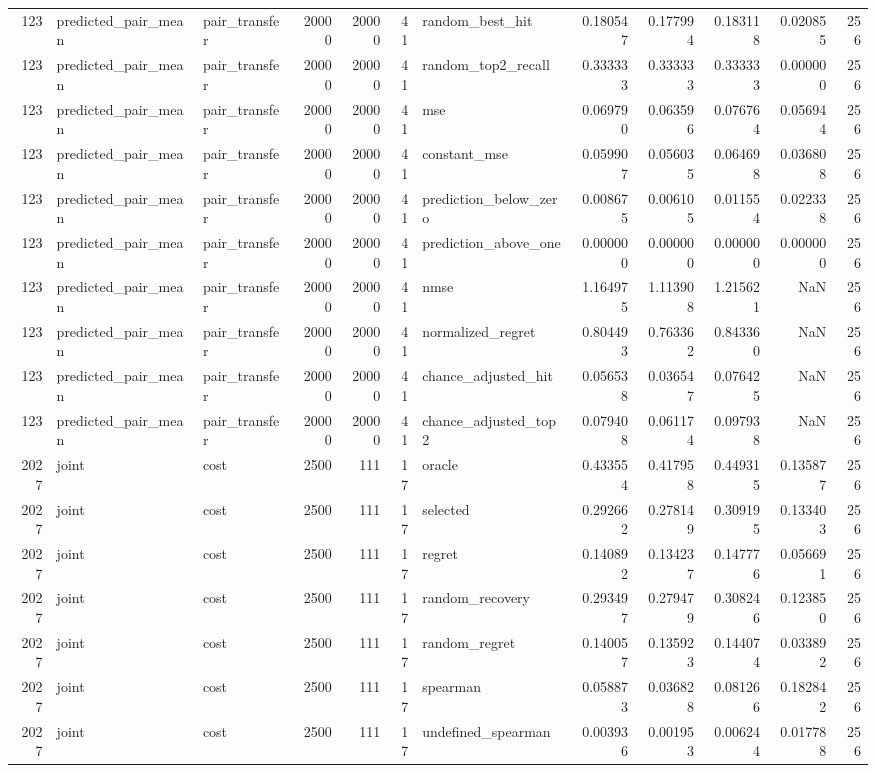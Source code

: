 \begin{tabular}{rllrrrlrrrrr}
123 & predicted_pair_mean & pair_transfer & 20000 & 20000 & 41 & random_best_hit & 0.180547 & 0.177994 & 0.183118 & 0.020855 & 256 \\
123 & predicted_pair_mean & pair_transfer & 20000 & 20000 & 41 & random_top2_recall & 0.333333 & 0.333333 & 0.333333 & 0.000000 & 256 \\
123 & predicted_pair_mean & pair_transfer & 20000 & 20000 & 41 & mse & 0.069790 & 0.063596 & 0.076764 & 0.056944 & 256 \\
123 & predicted_pair_mean & pair_transfer & 20000 & 20000 & 41 & constant_mse & 0.059907 & 0.056035 & 0.064698 & 0.036808 & 256 \\
123 & predicted_pair_mean & pair_transfer & 20000 & 20000 & 41 & prediction_below_zero & 0.008675 & 0.006105 & 0.011554 & 0.022338 & 256 \\
123 & predicted_pair_mean & pair_transfer & 20000 & 20000 & 41 & prediction_above_one & 0.000000 & 0.000000 & 0.000000 & 0.000000 & 256 \\
123 & predicted_pair_mean & pair_transfer & 20000 & 20000 & 41 & nmse & 1.164975 & 1.113908 & 1.215621 & NaN & 256 \\
123 & predicted_pair_mean & pair_transfer & 20000 & 20000 & 41 & normalized_regret & 0.804493 & 0.763362 & 0.843360 & NaN & 256 \\
123 & predicted_pair_mean & pair_transfer & 20000 & 20000 & 41 & chance_adjusted_hit & 0.056538 & 0.036547 & 0.076425 & NaN & 256 \\
123 & predicted_pair_mean & pair_transfer & 20000 & 20000 & 41 & chance_adjusted_top2 & 0.079408 & 0.061174 & 0.097938 & NaN & 256 \\
2027 & joint & cost & 2500 & 111 & 17 & oracle & 0.433554 & 0.417958 & 0.449315 & 0.135877 & 256 \\
2027 & joint & cost & 2500 & 111 & 17 & selected & 0.292662 & 0.278149 & 0.309195 & 0.133403 & 256 \\
2027 & joint & cost & 2500 & 111 & 17 & regret & 0.140892 & 0.134237 & 0.147776 & 0.056691 & 256 \\
2027 & joint & cost & 2500 & 111 & 17 & random_recovery & 0.293497 & 0.279479 & 0.308246 & 0.123850 & 256 \\
2027 & joint & cost & 2500 & 111 & 17 & random_regret & 0.140057 & 0.135923 & 0.144074 & 0.033892 & 256 \\
2027 & joint & cost & 2500 & 111 & 17 & spearman & 0.058873 & 0.036828 & 0.081266 & 0.182842 & 256 \\
2027 & joint & cost & 2500 & 111 & 17 & undefined_spearman & 0.003936 & 0.001953 & 0.006244 & 0.017788 & 256 \\

\end{tabular}
